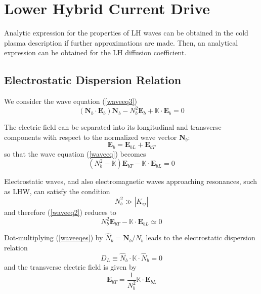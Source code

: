 \section{Lower Hybrid Current Drive\label{LHCD}}

Analytic expression for the properties of LH waves can be obtained in the cold
plasma description if further approximations are made. Then, an analytical
expression can be obtained for the LH diffusion coefficient.

\subsection{Electrostatic Dispersion Relation}

We consider the wave equation (\ref{waveeq3})
\begin{equation}
(\mathbf{N}_{b}\cdot\mathbf{E}_{b})\mathbf{N}_{b}-N_{b}^{2}\mathbf{E}%
_{b}+\mathbb{K}\cdot\mathbf{E}_{b}=0 \label{waveeq}%
\end{equation}

The electric field can be separated into its longitudinal and transverse
components with respect to the normalized wave vector $\mathbf{N}_{b}$:
\begin{equation}
\mathbf{E}_{b}=\mathbf{E}_{bL}+\mathbf{E}_{bT} \label{edecomp}%
\end{equation}
so that the wave equation (\ref{waveeq}) becomes
\begin{equation}
(N_{b}^{2}-\mathbb{K})\mathbf{E}_{bT}-\mathbb{K}\cdot\mathbf{E}_{bL}=0
\label{waveeq2}%
\end{equation}

Electrostatic waves, and also electromagnetic waves approaching resonances,
such as LHW, can satisfy the condition
\begin{equation}
N_{b}^{2}\gg|K_{ij}| \label{esapprox}%
\end{equation}
and therefore (\ref{waveeq2}) reduces to
\begin{equation}
N_{b}^{2}\mathbf{E}_{bT}-\mathbb{K}\cdot\mathbf{E}_{bL}\simeq0
\label{waveeqes}%
\end{equation}

Dot-multiplying (\ref{waveeqes}) by $\widehat{N}_{b}=\mathbf{N}_{b}/N_{b}$
leads to the electrostatic dispersion relation
\begin{equation}
D_{L}\equiv\widehat{N}_{b}\cdot\mathbb{K}\cdot\widehat{N}_{b}=0
\label{dispreles}%
\end{equation}
and the transverse electric field is given by
\begin{equation}
\mathbf{E}_{bT}=\frac{1}{N_{b}^{2}}\mathbb{K}\cdot\mathbf{E}_{bL} \label{et}%
\end{equation}

